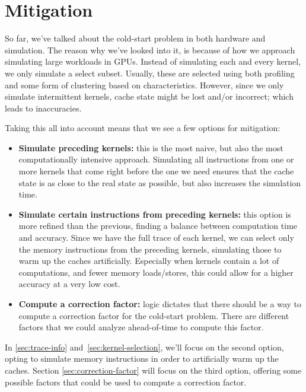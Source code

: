 \chapter{Mitigation}\label{ch:mitigation}

So far, we've talked about the cold-start problem in both hardware and simulation.
The reason why we've looked into it, is because of how we approach simulating large workloads in GPUs.
Instead of simulating each and every kernel, we only simulate a select subset.
Usually, these are selected using both profiling and some form of clustering based on characteristics.
However, since we only simulate intermittent kernels, cache state might be lost and/or incorrect; which leads to inaccuracies.

Taking this all into account means that we see a few options for mitigation:
\begin{itemize}
    \item \textbf{Simulate preceding kernels:} this is the most naive, but also the most computationally intensive approach.
    Simulating all instructions from one or more kernels that come right before the one we need ensures that the cache state is as close to the real state as possible, but also increases the simulation time.
    \item \textbf{Simulate certain instructions from preceding kernels:} this option is more refined than the previous, finding a balance between computation time and accuracy.
    Since we have the full trace of each kernel, we can select only the memory instructions from the preceding kernels, simulating those to warm up the caches artificially.
    Especially when kernels contain a lot of computations, and fewer memory loads/stores, this could allow for a higher accuracy at a very low cost.
    \item \textbf{Compute a correction factor:} logic dictates that there should be a way to compute a correction factor for the cold-start problem.
    There are different factors that we could analyze ahead-of-time to compute this factor.
\end{itemize}

In \cref{sec:trace-info} and\ \ref{sec:kernel-selection}, we'll focus on the second option, opting to simulate memory instructions in order to artificially warm up the caches.
Section \ref{sec:correction-factor} will focus on the third option, offering some possible factors that could be used to compute a correction factor.

\FloatBarrier
